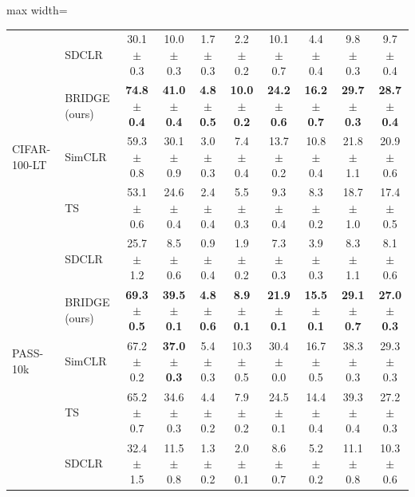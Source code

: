\begin{table}[t]
\begin{adjustbox}{max width=\textwidth}
\begin{tabular}{l l c c c c c c c c}
 & SDCLR & 30.1 {\scriptsize$\pm$ 0.3} & 10.0 {\scriptsize$\pm$ 0.3} & 1.7 {\scriptsize$\pm$ 0.3} & 2.2 {\scriptsize$\pm$ 0.2} & 10.1 {\scriptsize$\pm$ 0.7} & 4.4 {\scriptsize$\pm$ 0.4} & 9.8 {\scriptsize$\pm$ 0.3} & 9.7 {\scriptsize$\pm$ 0.4} \\
\rowcolor{blue!10} & BRIDGE (ours) & \textbf{74.8 {\scriptsize$\pm$ 0.4}} & \textbf{41.0 {\scriptsize$\pm$ 0.4}} & \textbf{4.8 {\scriptsize$\pm$ 0.5}} & \textbf{10.0 {\scriptsize$\pm$ 0.2}} & \textbf{24.2 {\scriptsize$\pm$ 0.6}} & \textbf{16.2 {\scriptsize$\pm$ 0.7}} & \textbf{29.7 {\scriptsize$\pm$ 0.3}} & \textbf{28.7 {\scriptsize$\pm$ 0.4}} \\
\midrule
CIFAR-100-LT & SimCLR & 59.3 {\scriptsize$\pm$ 0.8} & 30.1 {\scriptsize$\pm$ 0.9} & 3.0 {\scriptsize$\pm$ 0.3} & 7.4 {\scriptsize$\pm$ 0.4} & 13.7 {\scriptsize$\pm$ 0.2} & 10.8 {\scriptsize$\pm$ 0.4} & 21.8 {\scriptsize$\pm$ 1.1} & 20.9 {\scriptsize$\pm$ 0.6} \\
 & TS & 53.1 {\scriptsize$\pm$ 0.6} & 24.6 {\scriptsize$\pm$ 0.4} & 2.4 {\scriptsize$\pm$ 0.4} & 5.5 {\scriptsize$\pm$ 0.3} & 9.3 {\scriptsize$\pm$ 0.4} & 8.3 {\scriptsize$\pm$ 0.2} & 18.7 {\scriptsize$\pm$ 1.0} & 17.4 {\scriptsize$\pm$ 0.5} \\
 & SDCLR & 25.7 {\scriptsize$\pm$ 1.2} & 8.5 {\scriptsize$\pm$ 0.6} & 0.9 {\scriptsize$\pm$ 0.4} & 1.9 {\scriptsize$\pm$ 0.2} & 7.3 {\scriptsize$\pm$ 0.3} & 3.9 {\scriptsize$\pm$ 0.3} & 8.3 {\scriptsize$\pm$ 1.1} & 8.1 {\scriptsize$\pm$ 0.6} \\
\rowcolor{blue!10} & BRIDGE (ours) & \textbf{69.3 {\scriptsize$\pm$ 0.5}} & \textbf{39.5 {\scriptsize$\pm$ 0.1}} & \textbf{4.8 {\scriptsize$\pm$ 0.6}} & \textbf{8.9 {\scriptsize$\pm$ 0.1}} & \textbf{21.9 {\scriptsize$\pm$ 0.1}} & \textbf{15.5 {\scriptsize$\pm$ 0.1}} & \textbf{29.1 {\scriptsize$\pm$ 0.7}} & \textbf{27.0 {\scriptsize$\pm$ 0.3}} \\
\midrule
PASS-10k & SimCLR & 67.2 {\scriptsize$\pm$ 0.2} & \textbf{37.0 {\scriptsize$\pm$ 0.3}} & 5.4 {\scriptsize$\pm$ 0.3} & 10.3 {\scriptsize$\pm$ 0.5} & 30.4 {\scriptsize$\pm$ 0.0} & 16.7 {\scriptsize$\pm$ 0.5} & 38.3 {\scriptsize$\pm$ 0.3} & 29.3 {\scriptsize$\pm$ 0.3} \\
 & TS & 65.2 {\scriptsize$\pm$ 0.7} & 34.6 {\scriptsize$\pm$ 0.3} & 4.4 {\scriptsize$\pm$ 0.2} & 7.9 {\scriptsize$\pm$ 0.2} & 24.5 {\scriptsize$\pm$ 0.1} & 14.4 {\scriptsize$\pm$ 0.4} & 39.3 {\scriptsize$\pm$ 0.4} & 27.2 {\scriptsize$\pm$ 0.3} \\
 & SDCLR & 32.4 {\scriptsize$\pm$ 1.5} & 11.5 {\scriptsize$\pm$ 0.8} & 1.3 {\scriptsize$\pm$ 0.2} & 2.0 {\scriptsize$\pm$ 0.1} & 8.6 {\scriptsize$\pm$ 0.7} & 5.2 {\scriptsize$\pm$ 0.2} & 11.1 {\scriptsize$\pm$ 0.8} & 10.3 {\scriptsize$\pm$ 0.6} \\

\end{tabular}
\end{adjustbox}
\end{table}
